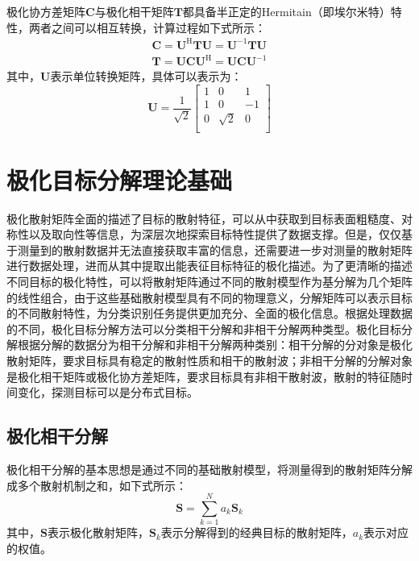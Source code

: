 极化协方差矩阵$\textbf{C}$与极化相干矩阵$\textbf{T}$都具备半正定的Hermitain（即埃尔米特）特性，两者之间可以相互转换，计算过程如下式所示：
\begin{gather}
    \textbf{C}=\textbf{U}^\text{H} \textbf{T} \textbf{U}=\textbf{U}^{-1} \textbf{T} \textbf{U} \\
    \textbf{T}=\textbf{U} \textbf{C} \textbf{U}^\text{H}=\textbf{U} \textbf{C} \textbf{U}^{-1}
\end{gather}
其中，$\textbf{U}$表示单位转换矩阵，具体可以表示为：
\begin{equation}
    \textbf{U}=\frac{1}{\sqrt{2}}\left[ \begin{matrix}
            1 & 0        & 1  \\
            1 & 0        & -1 \\
            0 & \sqrt{2} & 0  \\
        \end{matrix} \right]
\end{equation}

\section{极化目标分解理论基础}
极化散射矩阵全面的描述了目标的散射特征，可以从中获取到目标表面粗糙度、对称性以及取向性等信息，为深层次地探索目标特性提供了数据支撑。但是，仅仅基于测量到的散射数据并无法直接获取丰富的信息，还需要进一步对测量的散射矩阵进行数据处理，进而从其中提取出能表征目标特征的极化描述。为了更清晰的描述不同目标的极化特性，可以将散射矩阵通过不同的散射模型作为基分解为几个矩阵的线性组合，由于这些基础散射模型具有不同的物理意义，分解矩阵可以表示目标的不同散射特性，为分类识别任务提供更加充分、全面的极化信息。根据处理数据的不同，极化目标分解方法可以分类相干分解和非相干分解两种类型。极化目标分解根据分解的数据分为相干分解和非相干分解两种类别：相干分解的分对象是极化散射矩阵，要求目标具有稳定的散射性质和相干的散射波；非相干分解的分解对象是极化相干矩阵或极化协方差矩阵，要求目标具有非相干散射波，散射的特征随时间变化，探测目标可以是分布式目标。
\subsection{极化相干分解}
极化相干分解的基本思想是通过不同的基础散射模型，将测量得到的散射矩阵分解成多个散射机制之和，如下式所示：
\begin{equation}
    \textbf{S}=\sum_{k=1}^N{a_k\textbf{S}_k}
\end{equation}
其中，$\textbf{S}$表示极化散射矩阵，$\textbf{S}_k$表示分解得到的经典目标的散射矩阵，$a_k$表示对应的权值。

